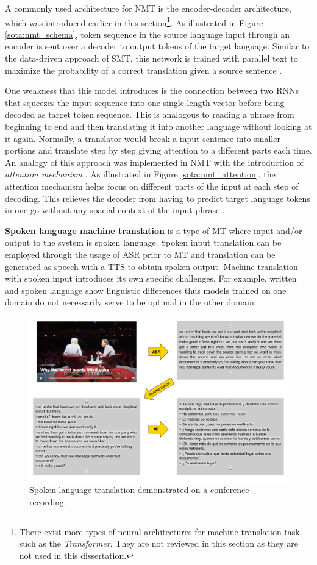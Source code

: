A commonly used architecture for NMT is the encoder-decoder architecture, which was introduced earlier in this section\footnote{There exist more types of neural architectures for machine translation task such as the \textit{Transformer}. They are not reviewed in this section as they are not used in this dissertation. }. As illustrated in Figure \ref{sota:nmt_schema}, token sequence in the source language input through an encoder is sent over a decoder to output tokens of the target language. Similar to the data-driven approach of SMT, this network is trained with parallel text to maximize the probability of a correct translation given a source sentence \citep{bahdanau}.

One weakness that this model introduces is the connection between two RNNs that squeezes the input sequence into one single-length vector before being decoded as target token sequence. This is analogous to reading a phrase from beginning to end and then translating it into another language without looking at it again. Normally, a translator would break a input sentence into smaller portions and translate step by step giving attention to a different parts each time. An analogy of this approach was implemented in NMT with the introduction of \textit{attention mechanism} \citep{bahdanau, luong}. As illustrated in Figure \ref{sota:nmt_attention}, the attention mechanism helps focus on different parts of the input at each step of decoding. This relieves the decoder from having to predict target language tokens in one go without any spacial context of the input phrase \citep{google_nmt}. 

\textbf{Spoken language machine translation} is a type of MT where input and/or output to the system is spoken language. Spoken input translation can be employed through the usage of ASR prior to MT and translation can be generated as speech with a TTS to obtain spoken output. Machine translation with spoken input introduces its own specific challenges. For example, written and spoken language show linguistic differences thus models trained on one domain do not necessarily serve to be optimal in the other domain. 

\begin{figure}[t]
  \centering
  \includegraphics[width=\linewidth]{img/slmt_on_ted.pdf}
  \caption{Spoken language translation demonstrated on a conference recording.}
  \label{sota:tv_transcription}
\end{figure}

